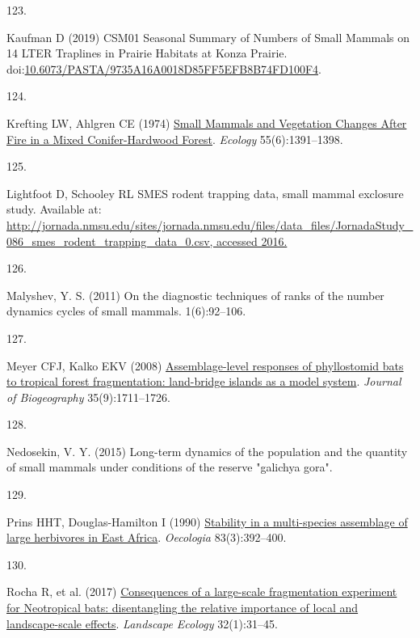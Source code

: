 \documentclass{article}
\newlength{\cslhangindent}
\newlength{\csllabelwidth}
\newlength{\cslentryspacingunit} %
\newenvironment{CSLReferences}[2] %
 {%
  \setlength{\parindent}{0pt}
  \ifodd #1
  \let\oldpar\par
  \def\par{\hangindent=\cslhangindent\oldpar}
  \fi
  \setlength{\parskip}{#2\cslentryspacingunit}
 }%
 {}
\newcommand{\CSLLeftMargin}[1]{\parbox[t]{\csllabelwidth}{#1}}
\newcommand{\CSLRightInline}[1]{\parbox[t]{\linewidth - \csllabelwidth}{#1}\break}
\begin{document}
\begin{CSLReferences}{0}{0}
\leavevmode{}%
\CSLLeftMargin{123. }%
\CSLRightInline{Kaufman D (2019) CSM01 Seasonal Summary of Numbers of
Small Mammals on 14 LTER Traplines in Prairie Habitats at Konza Prairie.
doi:\href{https://doi.org/10.6073/PASTA/9735A16A0018D85FF5EFB8B74FD100F4}{10.6073/PASTA/9735A16A0018D85FF5EFB8B74FD100F4}.}

\leavevmode{}%
\CSLLeftMargin{124. }%
\CSLRightInline{Krefting LW, Ahlgren CE (1974)
\href{https://doi.org/10.2307/1935467}{Small Mammals and Vegetation
Changes After Fire in a Mixed Conifer-Hardwood Forest}. \emph{Ecology}
55(6):1391--1398.}

\leavevmode{}%
\CSLLeftMargin{125. }%
\CSLRightInline{Lightfoot D, Schooley RL SMES rodent trapping data,
small mammal exclosure study. Available at:
\href{http://jornada.nmsu.edu/sites/jornada.nmsu.edu/files/data_files/JornadaStudy_086_smes_rodent_trapping_data_0.csv,\%20accessed\%202016.}{http://jornada.nmsu.edu/sites/jornada.nmsu.edu/files/data\_files/JornadaStudy\_086\_smes\_rodent\_trapping\_data\_0.csv,
accessed 2016.}}

\leavevmode{}%
\CSLLeftMargin{126. }%
\CSLRightInline{Malyshev, Y. S. (2011) On the diagnostic techniques of
ranks of the number dynamics cycles of small mammals. 1(6):92--106.}

\leavevmode{}%
\CSLLeftMargin{127. }%
\CSLRightInline{Meyer CFJ, Kalko EKV (2008)
\href{https://doi.org/10.1111/j.1365-2699.2008.01916.x}{Assemblage-level
responses of phyllostomid bats to tropical forest fragmentation:
land-bridge islands as a model system}. \emph{Journal of Biogeography}
35(9):1711--1726.}

\leavevmode{}%
\CSLLeftMargin{128. }%
\CSLRightInline{Nedosekin, V. Y. (2015) Long-term dynamics of the
population and the quantity of small mammals under conditions of the
reserve {"}galichya gora{"}.}

\leavevmode{}%
\CSLLeftMargin{129. }%
\CSLRightInline{Prins HHT, Douglas-Hamilton I (1990)
\href{https://doi.org/10.1007/BF00317566}{Stability in a multi-species
assemblage of large herbivores in East Africa}. \emph{Oecologia}
83(3):392--400.}

\leavevmode{}%
\CSLLeftMargin{130. }%
\CSLRightInline{Rocha R, et al. (2017)
\href{https://doi.org/10.1007/s10980-016-0425-3}{Consequences of a
large-scale fragmentation experiment for Neotropical bats: disentangling
the relative importance of local and landscape-scale effects}.
\emph{Landscape Ecology} 32(1):31--45.}


\end{CSLReferences}
\end{document}
